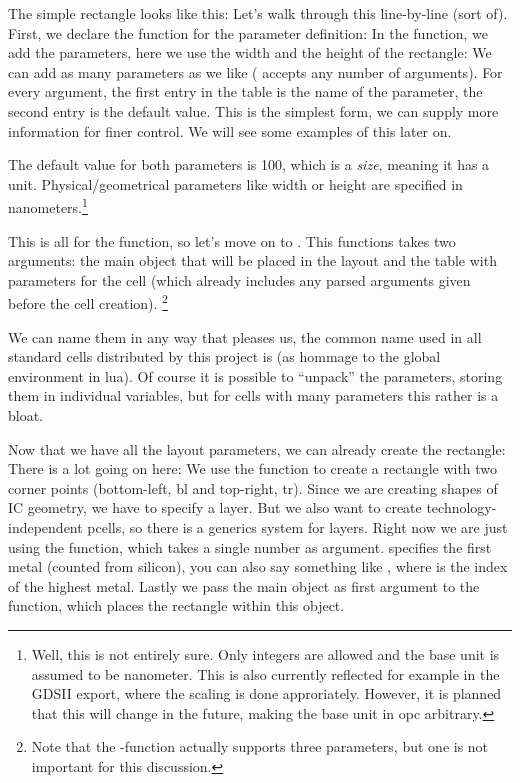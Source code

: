 The simple rectangle looks like this:
Let's walk through this line-by-line (sort of). First, we declare the function for the parameter definition:
In the function, we add the parameters, here we use the width and the height of the rectangle:
We can add as many parameters as we like ( accepts any number of arguments).
For every argument, the first entry in the table is the name of the parameter, the second entry is the default value.
This is the simplest form, we can supply more information for finer control.
We will see some examples of this later on.

The default value for both parameters is 100, which is a \emph{size}, meaning it has a unit. Physical/geometrical parameters like width or height are specified
in nanometers.\footnote{Well, this is not entirely sure. Only integers are allowed and the base unit is assumed to be nanometer. This is also
currently reflected for example in the GDSII export, where the scaling is done approriately. However, it is planned that this will change in the
future, making the base unit in opc arbitrary.}

This is all for the  function, so let's move on to .
This functions takes two arguments: the main object that will be placed in the layout and the table with parameters for the cell (which already includes any parsed arguments given before the cell creation).
\footnote{Note that the -function actually supports three parameters, but one is not important for this discussion.}

We can name them in any way that pleases us, the common name used in all standard cells distributed by this project is  (as hommage to the global
environment  in lua).
Of course it is possible to \enquote{unpack} the parameters, storing them in individual variables, but for cells with many parameters this rather is a bloat.

Now that we have all the layout parameters, we can already create the rectangle:
There is a lot going on here: We use the  function to create a rectangle with two corner points (bottom-left, bl and top-right, tr).
Since we are creating shapes of IC geometry, we have to specify a layer.
But we also want to create technology-independent pcells, so there is a generics system for layers.
Right now we are just using the  function, which takes a single number as argument.
 specifies the first metal (counted from silicon), you can also say something like , where  is the index of the highest metal.
Lastly we pass the main object as first argument to the function, which places the rectangle within this object.

